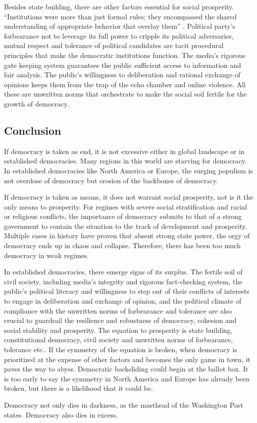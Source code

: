 \documentclass{scrartcl}
\begin{document}
Besides state building, there are other factors essential for social
prosperity. ``Institutions were more than just formal rules; they
encompassed the shared understanding of appropriate behavior that
overlay them'' \autocite[213]{demdie}. Political party's forbearance
not to leverage its full power to cripple its political adversaries,
mutual respect and tolerance of political candidates are tacit procedural
principles that make the democratic institutions function. The media's
rigorous gate keeping system guarantees the public sufficient access
to information and fair analysis. The public's willingness to deliberation
and rational exchange of opinions keeps them from the trap of the
echo chamber and online violence. All these are unwritten norms that
orchestrate to make the social soil fertile for the growth of democracy.

\bigskip{}


\subsection*{Conclusion}

If democracy is taken as end, it is not excessive either in global
landscape or in established democracies. Many regions in this world
are starving for democracy. In established democracies like North
America or Europe, the surging populism is not overdose of democracy
but erosion of the backbones of democracy. 

If democracy is taken as means, it does not warrant social prosperity,
not is it the only means to prosperity. For regimes with severe social
stratification and racial or religious conflicts, the importance of
democracy submits to that of a strong government to contain the situation
to the track of development and prosperity. Multiple cases in history
have proven that absent strong state power, the orgy of democracy
ends up in chaos and collapse. Therefore, there has been too much
democracy in weak regimes. 

In established democracies,
 there emerge signs of its surplus.
 The fertile soil of civil society,
including media's integrity and
rigorous fact-checking system, the public's political literacy and
willingness to step out of their conflicts of interests to engage
in deliberation and exchange of opinion, and the political climate
of compliance with the unwritten norms of forbearance and tolerance
are also crucial to guardrail the resilience and robustness of democracy,
cohesion and social stability and prosperity. The equation to prosperity
is state building, constitutional democracy, civil society and unwritten
norms of forbearance, tolerance etc.. If the symmetry of the equation
is broken, when democracy is prioritized at the expense of other factors
and becomes the only game in town, it paves the way to abyss. Democratic
backsliding could begin at the ballot box. 
It is too early to say
the symmetry in North America and Europe has already been broken,
but there is a likelihood that it could be.

Democracy not only dies in darkness,
 as the masthead of the Washington Post states.
 Democracy also dies in excess.

\printbibliography
\end{document}
